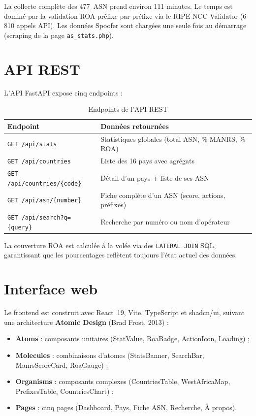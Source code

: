 \documentclass{eneam}
\begin{document}
La collecte complète des 477~ASN prend environ 111 minutes. Le temps est dominé par la validation ROA préfixe par préfixe via le RIPE NCC Validator (6\,810 appels API). Les données Spoofer sont chargées une seule fois au démarrage (scraping de la page \texttt{as\_stats.php}).

\section{API REST}

L'API FastAPI expose cinq endpoints :

\begin{table}[H]
\caption{Endpoints de l'API REST}
\centering
\begin{tabularx}{\textwidth}{|l|X|}
\hline
\textbf{Endpoint} & \textbf{Données retournées} \\
\hline
\texttt{GET /api/stats} & Statistiques globales (total ASN, \% MANRS, \% ROA) \\
\hline
\texttt{GET /api/countries} & Liste des 16 pays avec agrégats \\
\hline
\texttt{GET /api/countries/\{code\}} & Détail d'un pays + liste de ses ASN \\
\hline
\texttt{GET /api/asn/\{number\}} & Fiche complète d'un ASN (score, actions, préfixes) \\
\hline
\texttt{GET /api/search?q=\{query\}} & Recherche par numéro ou nom d'opérateur \\
\hline
\end{tabularx}
\end{table}

La couverture ROA est calculée à la volée via des \texttt{LATERAL JOIN} SQL, garantissant que les pourcentages reflètent toujours l'état actuel des données.

\section{Interface web}

Le frontend est construit avec React~19, Vite, TypeScript et shadcn/ui, suivant une architecture \textbf{Atomic Design} (Brad Frost, 2013) :

\begin{itemize}
    \item \textbf{Atoms} : composants unitaires (StatValue, RoaBadge, ActionIcon, Loading) ;
    \item \textbf{Molecules} : combinaisons d'atomes (StatsBanner, SearchBar, ManrsScoreCard, RoaGauge) ;
    \item \textbf{Organisms} : composants complexes (CountriesTable, WestAfricaMap, PrefixesTable, CountriesChart) ;
    \item \textbf{Pages} : cinq pages (Dashboard, Pays, Fiche ASN, Recherche, À propos).
\end{itemize}
\end{document}
